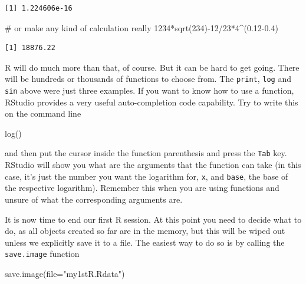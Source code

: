 \documentclass[
  letterpaper,
  DIV=11,
  numbers=noendperiod]{scrartcl}
\newenvironment{Shaded}{\begin{snugshade}}{\end{snugshade}}
\newcommand{\AttributeTok}[1]{\textcolor[rgb]{0.40,0.45,0.13}{#1}}
\newcommand{\CommentTok}[1]{\textcolor[rgb]{0.37,0.37,0.37}{#1}}
\newcommand{\DecValTok}[1]{\textcolor[rgb]{0.68,0.00,0.00}{#1}}
\newcommand{\FloatTok}[1]{\textcolor[rgb]{0.68,0.00,0.00}{#1}}
\newcommand{\FunctionTok}[1]{\textcolor[rgb]{0.28,0.35,0.67}{#1}}
\newcommand{\NormalTok}[1]{\textcolor[rgb]{0.00,0.23,0.31}{#1}}
\newcommand{\SpecialCharTok}[1]{\textcolor[rgb]{0.37,0.37,0.37}{#1}}
\newcommand{\StringTok}[1]{\textcolor[rgb]{0.13,0.47,0.30}{#1}}
\begin{document}
\begin{verbatim}
[1] 1.224606e-16
\end{verbatim}

\begin{Shaded}
\begin{Highlighting}[]
\CommentTok{\# or make any kind of calculation really}
\DecValTok{1234}\SpecialCharTok{*}\FunctionTok{sqrt}\NormalTok{(}\DecValTok{234}\NormalTok{)}\SpecialCharTok{{-}}\DecValTok{12}\SpecialCharTok{/}\DecValTok{23}\SpecialCharTok{*}\DecValTok{4}\SpecialCharTok{\^{}}\NormalTok{(}\FloatTok{0.12{-}0.4}\NormalTok{)}
\end{Highlighting}
\end{Shaded}

\begin{verbatim}
[1] 18876.22
\end{verbatim}

R will do much more than that, of course. But it can be hard to get
going. There will be hundreds or thousands of functions to choose from.
The \texttt{print}, \texttt{log} and \texttt{sin} above were just three
examples. If you want to know how to use a function, RStudio provides a
very useful auto-completion code capability. Try to write this on the
command line

\begin{Shaded}
\begin{Highlighting}[]
\FunctionTok{log}\NormalTok{()}
\end{Highlighting}
\end{Shaded}

and then put the cursor inside the function parenthesis and press the
\texttt{Tab} key. RStudio will show you what are the arguments that the
function can take (in this case, it's just the number you want the
logarithm for, \texttt{x}, and \texttt{base}, the base of the respective
logarithm). Remember this when you are using functions and unsure of
what the corresponding arguments are.

It is now time to end our first R session. At this point you need to
decide what to do, as all objects created so far are in the memory, but
this will be wiped out unless we explicitly save it to a file. The
easiest way to do so is by calling the \texttt{save.image} function

\begin{Shaded}
\begin{Highlighting}[]
\FunctionTok{save.image}\NormalTok{(}\AttributeTok{file=}\StringTok{"my1stR.Rdata"}\NormalTok{)}
\end{Highlighting}
\end{Shaded}
\end{document}
